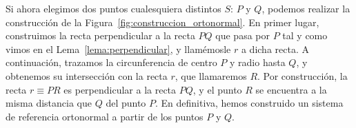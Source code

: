 \noindent
Si ahora elegimos dos puntos cualesquiera distintos $S$: $P$ y $Q$, podemos realizar la construcción de la Figura~\ref{fig:construccion_ortonormal}.  En primer lugar, construimos la recta perpendicular a la recta $PQ$ que pasa por $P$ tal y como vimos en el Lema~\ref{lema:perpendicular}, y llamémosle $r$ a dicha recta. A continuación, trazamos la circunferencia de centro $P$ y radio hasta $Q$, y obtenemos su intersección con la recta $r$, que llamaremos $R$. Por construcción, la recta $r\equiv PR$ es perpendicular a la recta $PQ$, y el punto $R$ se encuentra a la misma distancia que $Q$ del punto $P$. En definitiva, hemos construido un sistema de referencia ortonormal a partir de los puntos $P$ y $Q$.

